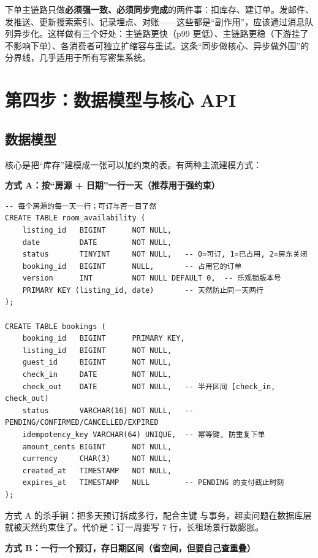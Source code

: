 \begin{idea}[解耦：把副作用赶出主链路]
下单主链路只做\textbf{必须强一致、必须同步完成}的两件事：扣库存、建订单。发邮件、发推送、更新搜索索引、记录埋点、对账——这些都是“副作用”，应该通过消息队列异步化。这样做有三个好处：主链路更快（p99 更低）、主链路更稳（下游挂了不影响下单）、各消费者可独立扩缩容与重试。这条“同步做核心、异步做外围”的分界线，几乎适用于所有写密集系统。
\end{idea}

\section{第四步：数据模型与核心 API}

\subsection{数据模型}

核心是把“库存”建模成一张可以加约束的表。有两种主流建模方式：

\textbf{方式 A：按“房源 + 日期”一行一天（推荐用于强约束）}

\begin{lstlisting}
-- 每个房源的每一天一行；可订与否一目了然
CREATE TABLE room_availability (
    listing_id   BIGINT      NOT NULL,
    date         DATE        NOT NULL,
    status       TINYINT     NOT NULL,   -- 0=可订, 1=已占用, 2=房东关闭
    booking_id   BIGINT      NULL,       -- 占用它的订单
    version      INT         NOT NULL DEFAULT 0,  -- 乐观锁版本号
    PRIMARY KEY (listing_id, date)       -- 天然防止同一天两行
);

CREATE TABLE bookings (
    booking_id   BIGINT      PRIMARY KEY,
    listing_id   BIGINT      NOT NULL,
    guest_id     BIGINT      NOT NULL,
    check_in     DATE        NOT NULL,
    check_out    DATE        NOT NULL,   -- 半开区间 [check_in, check_out)
    status       VARCHAR(16) NOT NULL,   -- PENDING/CONFIRMED/CANCELLED/EXPIRED
    idempotency_key VARCHAR(64) UNIQUE,  -- 幂等键, 防重复下单
    amount_cents BIGINT      NOT NULL,
    currency     CHAR(3)     NOT NULL,
    created_at   TIMESTAMP   NOT NULL,
    expires_at   TIMESTAMP   NULL        -- PENDING 的支付截止时刻
);
\end{lstlisting}

方式 A 的杀手锏：把多天预订拆成多行，配合主键  与事务，超卖问题在数据库层就被天然约束住了。代价是：订一周要写 7 行，长租场景行数膨胀。

\textbf{方式 B：一行一个预订，存日期区间（省空间，但要自己查重叠）}

